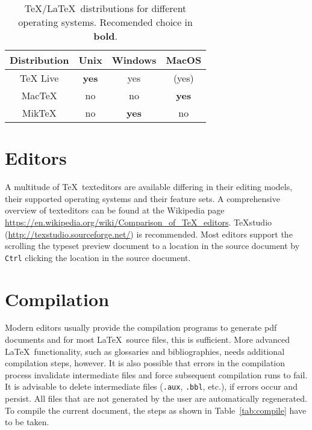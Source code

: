 \begin{table}
  \centering
  \begin{tabular}{cccc}
    \toprule
    Distribution & Unix         & Windows      & MacOS        \\
    \midrule
    TeX Live     & \textbf{yes} & yes          & (yes)        \\
    MacTeX       & no           & no           & \textbf{yes} \\
    MikTeX       & no           & \textbf{yes} & no           \\
    \bottomrule
  \end{tabular}
  \caption{\TeX/\LaTeX\ distributions for different operating systems. Recomended choice in \textbf{bold}.}
  \label{tab:distrib} %
\end{table}

\section{Editors}

A multitude of \TeX\ \glspl{texteditor} are available differing in their editing models, their supported operating systems and their feature sets.
A comprehensive overview of \glspl{texteditor} can be found at the Wikipedia page  \url{https://en.wikipedia.org/wiki/Comparison_of_TeX_editors}.
TeXstudio (\url{http://texstudio.sourceforge.net/}) is recommended.
Most editors support the scrolling the typeset preview document to a location in the source document by \verb|Ctrl| clicking the location in the source document.

\section{Compilation}

Modern editors usually provide the compilation programs to generate \gls{pdf} documents and for most \LaTeX\ source files, this is sufficient.
More advanced \LaTeX\ functionality, such as glossaries and bibliographies, needs additional compilation steps, however.
It is also possible that errors in the compilation process invalidate intermediate files and force subsequent compilation runs to fail.
It is advisable to delete intermediate files (\verb|.aux|, \verb|.bbl|, etc.), if errors occur and persist.
All files that are not generated by the user are automatically regenerated.
To compile the current document, the steps as shown in Table~\ref{tab:compile} have to be taken.


